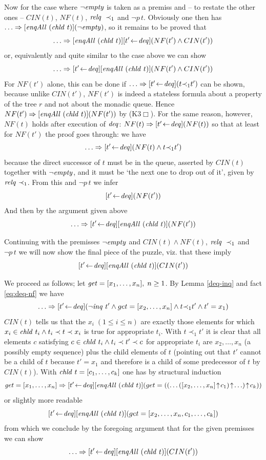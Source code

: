 Now for the case where $\lnot \mathit{empty}$ is taken as a premiss and -- to restate the
other ones -- $CIN(t)$, $NF(t)$, $\mathit{relq}~\prec_1$ and $\lnot p\,t$. Obviously one then has
$\ldots \Rightarrow [\mathit{enqAll}~(\mathit{chld}~t)](\lnot \mathit{empty})$, so it remains to be proved that
\[
\ldots \Rightarrow [\mathit{enqAll}~(\mathit{chld}~t)][t' \!\gets\! \mathit{deq}](NF(t') \land CIN(t'))
\]
or, equivalently and quite similar to the case above we can show
\[
\ldots \Rightarrow [t' \!\gets\! \mathit{deq}][\mathit{enqAll}~(\mathit{chld}~t)](NF(t') \land CIN(t'))
\]
For $NF(t')$ alone, this can be done if $\ldots \Rightarrow [t' \!\gets\! \mathit{deq}](t {\prec}_1 t')$ can be shown,
because unlike $CIN(t')$, $NF(t')$ is indeed a stateless formula about a
property of the tree $r$ and not about the monadic queue. Hence $NF(t') \Rightarrow
[\mathit{enqAll}~(\mathit{chld}~t)](NF(t'))$ by (K3$\Box$). For
the same reason, however, $NF(t)$ holds after execution of $\mathit{deq}$: $NF(t) \Rightarrow [t'
\!\gets\! \mathit{deq}](NF(t))$ so that at least for $NF(t')$ the proof goes through: we have
\begin{equation}
\label{eq:deq-nf}
\ldots \Rightarrow [t' \!\gets\! \mathit{deq}](NF(t) \land t {\prec}_1 t')
\end{equation}
because the direct successor of $t$ must be in the queue, asserted by $CIN(t)$
together with $\lnot\mathit{empty}$, and it must be `the next one to drop out of it', given
by $\mathit{relq}~{\prec}_1$. From this and $\lnot p\,t$ we infer
\[
[t' \!\gets\! \mathit{deq}](NF(t'))
\]
And then by the argument given above
\[
\ldots \Rightarrow [t' \!\gets\! \mathit{deq}][\mathit{enqAll}~(\mathit{chld}~t)](NF(t'))
\]

Continuing with the premisses $\lnot \mathit{empty}$ and $CIN(t) \land NF(t)$, $\mathit{relq}~\prec_1$ and $\lnot
p\,t$ we will now show the final piece of the puzzle, viz. that these imply
\begin{equation}
\label{peter}
[t' \!\gets\! \mathit{deq}][\mathit{enqAll}~(\mathit{chld}~t)](CIN(t'))
\end{equation}

We proceed as follows; let $\mathit{get} = [x_1,\ldots,x_n],\; n \geq 1$.  By Lemma
\ref{deq-inq} and fact \eqref{eq:deq-nf} we have
\[
\ldots \Rightarrow [t' \!\gets\! \mathit{deq}](\lnot \mathit{inq}~t' \land get = [x_2,\ldots, x_n] \land t {\prec}_1 t' \land t' = x_1)
\]
$CIN(t)$ tells us that the $x_i\; (1\leq i\leq n)$ are exactly those elements for which
$x_i \in \mathit{chld}~t_i \land t_i \prec t \prec x_i$ is true for appropriate $t_i$. With $t \prec_1 t'$
it is clear that all elements $c$ satisfying $c \in \mathit{chld}~t_i \land t_i \prec t' \prec c$ for
appropriate $t_i$ are $x_2,\ldots,x_n$ (a possibly empty sequence) plus the child
elements of $t$ (pointing out that $t'$ cannot be a child of $t$ because
$t' = x_1$ and therefore is a child of some predecessor of $t$ by $CIN(t)$). With
$\mathit{chld}~t = [c_1,\ldots,c_k]$ one has by structural induction
\[
\get = [x_1,\ldots,x_n] \Rightarrow [t' \leteq \deq][\enqAll~(\chld~t)](get = ((\ldots([x_2,\ldots,x_n]\Snoc c_1)\Snoc \ldots ) \Snoc c_k))
\]
or slightly more readable
\[
[t' \!\gets\! \mathit{deq}][\mathit{enqAll}~(\mathit{chld}~t)](get = [x_2,\ldots,x_n,c_1,\ldots,c_k])
\]
from which we conclude by the foregoing argument that for the given premisses we
can show
\[
\ldots \Rightarrow [t' \!\gets\! \mathit{deq}][\mathit{enqAll}~(\mathit{chld}~t)](CIN(t'))
\]

